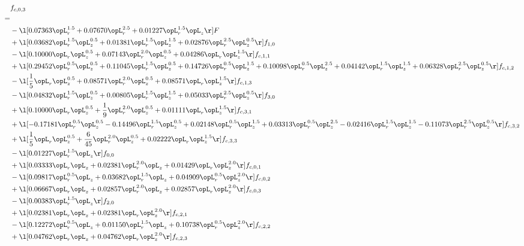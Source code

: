 \begin{alignat}{2} 
\label{eq:f_03_1} 
& f_{c,0,3} \nonumber \\ 
 = \\ 
& - \l[  0.07363 \opL_r^{1.5} +  0.07670 \opL_r^{2.5} +  0.01227 \opL_r^{1.5} \opL_z  \r] F \nonumber \\ 
& + \l[  0.03682 \opL_r^{1.5} \opL_z^{0.5} +  0.01381 \opL_r^{1.5} \opL_z^{1.5} +  0.02876 \opL_r^{2.5} \opL_z^{0.5}  \r] f_{1,0} \nonumber \\ 
& - \l[  0.10000 \opL_r \opL_z^{0.5} +  0.07143 \opL_r^{2.0} \opL_z^{0.5} +  0.04286 \opL_r \opL_z^{1.5}  \r] f_{c,1,1} \nonumber \\ 
& + \l[  0.29452 \opL_r^{0.5} \opL_z^{0.5} +  0.11045 \opL_r^{1.5} \opL_z^{0.5} +  0.14726 \opL_r^{0.5} \opL_z^{1.5} +  0.10098 \opL_r^{0.5} \opL_z^{2.5} +  0.04142 \opL_r^{1.5} \opL_z^{1.5} +  0.06328 \opL_r^{2.5} \opL_z^{0.5}  \r] f_{c,1,2} \nonumber \\ 
& - \l[ \frac{1}{5} \opL_r \opL_z^{0.5} +  0.08571 \opL_r^{2.0} \opL_z^{0.5} +  0.08571 \opL_r \opL_z^{1.5}  \r] f_{c,1,3} \nonumber \\ 
& - \l[  0.04832 \opL_r^{1.5} \opL_z^{0.5} +  0.00805 \opL_r^{1.5} \opL_z^{1.5} +  0.05033 \opL_r^{2.5} \opL_z^{0.5}  \r] f_{3,0} \nonumber \\ 
& + \l[  0.10000 \opL_r \opL_z^{0.5} + \frac{1}{9} \opL_r^{2.0} \opL_z^{0.5} +  0.01111 \opL_r \opL_z^{1.5}  \r] f_{c,3,1} \nonumber \\ 
& + \l[  -0.17181 \opL_r^{0.5} \opL_z^{0.5}   -0.14496 \opL_r^{1.5} \opL_z^{0.5} +  0.02148 \opL_r^{0.5} \opL_z^{1.5} +  0.03313 \opL_r^{0.5} \opL_z^{2.5}   -0.02416 \opL_r^{1.5} \opL_z^{1.5}   -0.11073 \opL_r^{2.5} \opL_z^{0.5}  \r] f_{c,3,2} \nonumber \\ 
& + \l[ \frac{1}{5} \opL_r \opL_z^{0.5} + \frac{6}{45} \opL_r^{2.0} \opL_z^{0.5} +  0.02222 \opL_r \opL_z^{1.5}  \r] f_{c,3,3} \nonumber \\ 
& - \l[  0.01227 \opL_r^{1.5} \opL_z  \r] f_{0,0} \nonumber \\ 
& + \l[  0.03333 \opL_r \opL_z +  0.02381 \opL_r^{2.0} \opL_z +  0.01429 \opL_r \opL_z^{2.0}  \r] f_{c,0,1} \nonumber \\ 
& - \l[  0.09817 \opL_r^{0.5} \opL_z +  0.03682 \opL_r^{1.5} \opL_z +  0.04909 \opL_r^{0.5} \opL_z^{2.0}  \r] f_{c,0,2} \nonumber \\ 
& + \l[  0.06667 \opL_r \opL_z +  0.02857 \opL_r^{2.0} \opL_z +  0.02857 \opL_r \opL_z^{2.0}  \r] f_{c,0,3} \nonumber \\ 
& - \l[  0.00383 \opL_r^{1.5} \opL_z  \r] f_{2,0} \nonumber \\ 
& + \l[  0.02381 \opL_r \opL_z +  0.02381 \opL_r \opL_z^{2.0}  \r] f_{c,2,1} \nonumber \\ 
& - \l[  0.12272 \opL_r^{0.5} \opL_z +  0.01150 \opL_r^{1.5} \opL_z +  0.10738 \opL_r^{0.5} \opL_z^{2.0}  \r] f_{c,2,2} \nonumber \\ 
& + \l[  0.04762 \opL_r \opL_z +  0.04762 \opL_r \opL_z^{2.0}  \r] f_{c,2,3} \nonumber \\ 
\end{alignat} 


